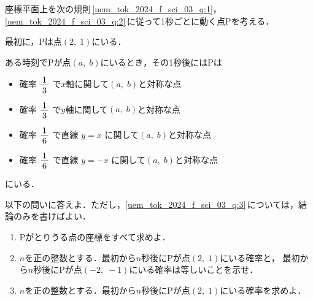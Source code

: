 ﻿\documentclass[../../../uem_tok_q.tex]{subfiles}
\begin{document}
    座標平面上を次の規則\,\ref{uem_tok_2024_f_sci_03_q:1}，%
    \ref{uem_tok_2024_f_sci_03_q:2}\,に従って1秒ごとに動く点Pを考える．

    \begin{myenua}
        \item 最初に，Pは点$(2,\;1)$にいる．\label{uem_tok_2024_f_sci_03_q:1}
        \item ある時刻でPが点$(a,\;b)$にいるとき，その1秒後にはPは
            
            \begin{itemize}[label={\textbullet}, leftmargin=2\zw, labelsep=.4\zw,
                topsep=1pt, itemsep=1pt]
                \item 確率 $\myfraca{1}{3}$ で$x$軸に関して$(a,\;b)$と対称な点
                \item 確率 $\myfraca{1}{3}$ で$y$軸に関して$(a,\;b)$と対称な点
                \item 確率 $\myfraca{1}{6}$ で直線 $y=x$ に関して$(a,\;b)$と対称な点
                \item 確率 $\myfraca{1}{6}$ で直線 $y=-x$ に関して$(a,\;b)$と対称な点
            \end{itemize}
            にいる．
            \label{uem_tok_2024_f_sci_03_q:2}
    \end{myenua}
    以下の問いに答えよ．ただし，\ref{uem_tok_2024_f_sci_03_q:3}\,については，結論のみを書けばよい．
    \begin{enumerate}
        \item Pがとりうる点の座標をすべて求めよ．\label{uem_tok_2024_f_sci_03_q:3}
        \item $n$を正の整数とする．最初から$n$秒後にPが点$(2,\;1)$にいる確率と，%
            最初から$n$秒後にPが点$(-2,\;-1)$にいる確率は等しいことを示せ．
        \item $n$を正の整数とする．最初から$n$秒後にPが点$(2,\;1)$にいる確率を求めよ．
    \end{enumerate}
\end{document}
